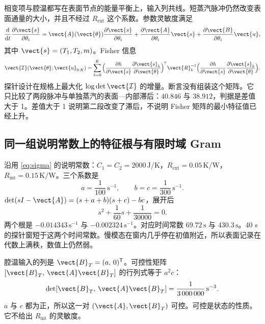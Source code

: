 相变项与腔温都写在表面节点的能量平衡上，输入列共线。短蒸汽脉冲仍然改变表面通量的大小，并且不经过 \(R_{\mathrm{ext}}\) 这个系数。参数灵敏度满足
\begin{equation}
\label{eq:sens}
\frac{\mathrm{d}}{\mathrm{d}t}\frac{\partial \vect{s}}{\partial\theta_i}
=\vect{A}(\vect{\theta})\frac{\partial \vect{s}}{\partial\theta_i}
+\frac{\partial \vect{A}}{\partial\theta_i}\vect{s}
+\frac{\partial \vect{B}}{\partial\theta_i}\vect{u},
\end{equation}
其中 \(\vect{s}=(T_1,T_2,m)\)。Fisher 信息
\begin{equation}
\label{eq:fisher}
\vect{\mathcal{I}}(\vect{\theta};\vect{u}_{0:K})
=\sum_{k=0}^{K}
\Big(\frac{\partial h}{\partial \vect{s}}\frac{\partial \vect{s}_k}{\partial\vect{\theta}}\Big)^{\!\top}
\vect{R}_k^{-1}
\Big(\frac{\partial h}{\partial \vect{s}}\frac{\partial \vect{s}_k}{\partial\vect{\theta}}\Big).
\end{equation}
探针设计在规格上最大化 \(\log\det\vect{\mathcal{I}}\) 的增量。断言没有组装这个矩阵。它只比较了两段脉冲与单独蒸汽的表面—内部滞后：\(40.846\) 与 \(38.912\)，判据是差值大于 1。差值大于 1 说明第二段改变了滞后，不说明 Fisher 矩阵的最小特征值已经上升。

\subsection{同一组说明常数上的特征根与有限时域 Gram}

沿用 \eqref{eq:sigma} 的说明常数：\(C_1=C_2=2000\,\mathrm{J/K}\)，\(R_{\mathrm{ext}}=0.05\,\mathrm{K/W}\)，\(R_{\mathrm{int}}=0.15\,\mathrm{K/W}\)。三个系数是
\[
a=\frac{1}{100}\,\mathrm{s}^{-1},\qquad
b=c=\frac{1}{300}\,\mathrm{s}^{-1}.
\]
\(\det(sI-\vect{A})=(s+a+b)(s+c)-bc\)，展开后
\begin{equation}
\label{eq:charpoly}
s^2+\frac{1}{60}s+\frac{1}{30000}=0.
\end{equation}
两个根是 \(-0.014343\,\mathrm{s}^{-1}\) 与 \(-0.002324\,\mathrm{s}^{-1}\)。对应时间常数 \(69.72\,\mathrm{s}\) 与 \(430.3\,\mathrm{s}\)。40 s 的探针窗短于这两个时间常数。慢模态在窗内几乎停在初值附近，所以表面记录在代数上满秩，数值上仍然弱。

腔温输入的列是 \(\vect{B}_T=(a,\,0)^{\mathsf T}\)。可控性矩阵 \([\vect{B}_T,\,\vect{A}\vect{B}_T]\) 的行列式等于 \(a^2 c\)：
\begin{equation}
\label{eq:ctrb}
\det[\vect{B}_T,\,\vect{A}\vect{B}_T]
=\frac{1}{3\,000\,000}\,\mathrm{s}^{-3}.
\end{equation}
\(a\) 与 \(c\) 都为正，所以这一对 \((\vect{A},\vect{B}_T)\) 可控。可控是状态的性质。它不给出 \(R_{\mathrm{int}}\) 的灵敏度。

